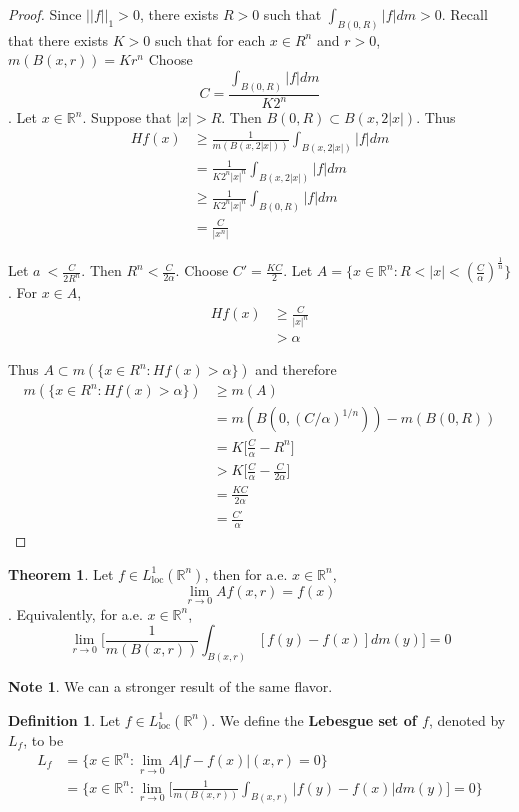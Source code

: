 \documentclass[12pt]{amsart}
\theoremstyle{definition}
\newtheorem{defn}[definition]{Definition}
\newtheorem{note}[definition]{Note}
\newtheorem{thm}[definition]{Theorem}
\newcommand{\al}{\alpha}
\newcommand{\R}{\mathbb{R}}
\newcommand{\Ll}{L^1_{\text{loc}}(\R^n)}
\begin{document}
	\begin{proof}
		Since $||f||_1 >0$, there exists $R>0$ such that $\int_{B(0,R)}|f|dm >0$. Recall that there exists $K>0$ such that for each $x \in R^n$ and $r>0$, $m(B(x,r)) = Kr^n$ Choose $$C = \frac{\int_{B(0,R)}|f|dm}{K2^n}$$. Let $x \in \R^n$. Suppose that $|x|>R$. Then $B(0,R) \subset B(x,2|x|)$. Thus 
		\begin{align*}
			Hf(x) 
			&\geq \frac{1}{m(B(x,2|x|))}\int_{B(x,2|x|)}|f|dm\\
			&= \frac{1}{K2^n|x|^n}\int_{B(x,2|x|)}|f|dm \\
			&\geq \frac{1}{K2^n|x|^n}\int_{B(0,R)}|f|dm \\
			&= \frac{C}{|x^n|}
		\end{align*}
		
		Let $a\ < \frac{C}{2R^n}$. Then $R^n < \frac{C}{2 \al}$. Choose $C' =\frac{KC}{2}$. Let $A = \{x \in \R^n: R < |x|< (\frac{C}{\al})^{\frac{1}{n}}\}$. For $x \in A$, 
		\begin{align*}
			Hf(x) 
			&\geq \frac{C}{|x|^n} \\
			& > \al
		\end{align*}
		
		Thus $A \subset m(\{x \in R^n: Hf(x)> \al\})$ and therefore 
		\begin{align*}
			m(\{x \in R^n: Hf(x)> \al\}) 
			&\geq m(A) \\
			&= m(B(0,(C/\al)^{1/n})) - m(B(0,R)) \\
			&= K\bigg [\frac{C}{\al} - R^n \bigg] \\
			&> K\bigg[\frac{C}{\al} - \frac{C}{2 \al}\bigg] \\
			&= \frac{KC}{2 \al}\\
			&= \frac{C'}{\al}
		\end{align*}
	\end{proof}
	
	\begin{thm}
		Let $f \in \Ll$, then for a.e. $x \in \R^n$, $$\lim_{r \rightarrow 0} Af(x,r) =f(x)$$. Equivalently, for a.e. $x \in \R^n$, $$ \lim_{r \rightarrow 0} \bigg[ \frac{1}{m(B(x,r))}\int_{B(x,r)}[f(y)-f(x)]dm(y)\bigg] =0$$
	\end{thm}
	
	\begin{note}
		We can a stronger result of the same flavor.
	\end{note}
	
	\begin{defn}
		Let $f \in \Ll$. We define the \textbf{Lebesgue set of $f$}, denoted by $L_f$, to be 
		\begin{align*}
			L_f 
			&= \{x \in \R^n: \lim_{r \rightarrow 0} A|f-f(x)|(x,r) =0 \}\\
			&= \bigg \{x \in \R^n: \lim_{r \rightarrow 0} \bigg[ \frac{1}{m(B(x,r))}\int_{B(x,r)}|f(y) - f(x)|dm(y)\bigg] =0 \bigg \}
		\end{align*}
	\end{defn}
	
\end{document}
